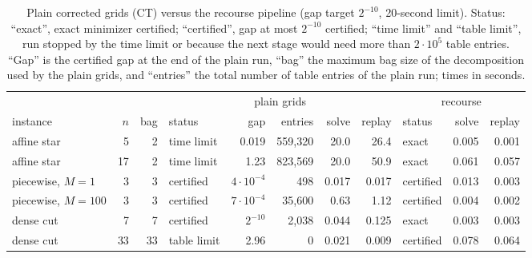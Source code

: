 \begin{table}[t]
\centering\small
\setlength{\tabcolsep}{4pt}
\caption{Plain corrected grids (CT) versus the recourse pipeline (gap target
$2^{-10}$, 20-second limit). Status: ``exact'', exact minimizer certified;
``certified'', gap at most $2^{-10}$ certified; ``time limit'' and ``table
limit'', run stopped by the time limit or because the next stage would need
more than $2\cdot10^5$ table entries. ``Gap'' is the certified gap at the end
of the plain run, ``bag'' the maximum bag size of the decomposition used by
the plain grids, and ``entries'' the total number of table entries of the
plain run; times in seconds.}\label{tab:recourse}
\begin{tabular}{lrrlrrrrlrr}
\toprule
&&&\multicolumn{5}{c}{plain grids}&\multicolumn{3}{c}{recourse}\\
\cmidrule(lr){4-8}\cmidrule(lr){9-11}
instance & $n$ & bag & status & gap & entries & solve & replay & status & solve & replay\\
\midrule
affine star & 5 & 2 & time limit & 0.019 & 559{,}320 & 20.0 & 26.4 & exact & 0.005 & 0.001\\
affine star & 17 & 2 & time limit & 1.23 & 823{,}569 & 20.0 & 50.9 & exact & 0.061 & 0.057\\
piecewise, $M=1$ & 3 & 3 & certified & $4\cdot10^{-4}$ & 498 & 0.017 & 0.017 & certified & 0.013 & 0.003\\
piecewise, $M=100$ & 3 & 3 & certified & $7\cdot10^{-4}$ & 35{,}600 & 0.63 & 1.12 & certified & 0.004 & 0.002\\
dense cut & 7 & 7 & certified & $2^{-10}$ & 2{,}038 & 0.044 & 0.125 & exact & 0.003 & 0.003\\
dense cut & 33 & 33 & table limit & 2.96 & 0 & 0.021 & 0.009 & certified & 0.078 & 0.064\\
\bottomrule
\end{tabular}
\end{table}
